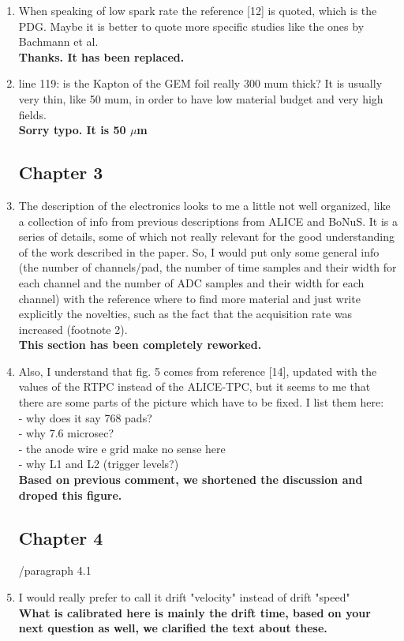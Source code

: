 \documentclass[a4paper,11pt,twoside]{article}
\begin{document}
\begin{enumerate}
\item When speaking of low spark rate the reference [12] is quoted, which is 
   the PDG. Maybe it is better to quote more specific studies like the ones by 
   Bachmann et al.\\
{ \bf Thanks. It has been replaced.} 

\item line 119: is the Kapton of the GEM foil really 300 mum thick? It is 
   usually very thin, like 50 mum, in order to have low material budget and 
   very high fields.\\
{ \bf Sorry typo. It is 50 $\mu$m} 

\subsection*{ Chapter 3}
\item The description of the electronics looks to me a little not well 
   organized, like a collection of info from previous descriptions from ALICE 
   and BoNuS. It is a series of details, some of which not really relevant for 
   the good understanding of the work described in the paper. So, I would put 
   only some general info (the number of channels/pad, the number of time 
   samples and their width for each channel and the number of  ADC samples and 
   their width for each channel) with the reference where to find more material 
   and just write explicitly the novelties, such as the fact that the 
   acquisition rate was increased (footnote 2).\\
{ \bf This section has been completely reworked.} 

\item Also, I understand that fig. 5 comes from reference [14], updated with 
   the values of the RTPC instead of the ALICE-TPC, but it seems to me that 
   there are some parts of the picture which have to be fixed. I list them 
   here:\\
- why does it say 768 pads?\\
- why 7.6 microsec?\\
- the anode wire e grid make no sense here\\
- why L1 and L2 (trigger levels?) \\
{ \bf Based on previous comment, we shortened the discussion and 
droped this figure. } 

\subsection*{ Chapter 4}
	/paragraph 4.1
\item I would really prefer to call it drift "velocity" instead of drift 
   "speed"\\
{ \bf What is calibrated here is mainly the drift time, based 
on your next question as well, we clarified the text about these.} 


\end{enumerate}
\end{document}
